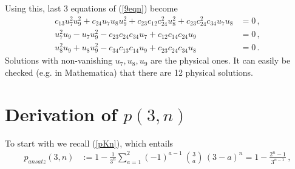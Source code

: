 \documentclass[12pt,a4paper]{JHEP3}
\newcommand{\refb}[1]{(\ref{#1})}
\begin{document}
Using this,  last 3 equations  of \refb{9eqn} become
\begin{align}
\nonumber
c_{13} u_7^2 u_9^2 + c_{24} u_7 u_8 u_9^2 +  c_{23} c_{12} c_{24}^2 u_8^2 + c_{23} c_{24}^2 c_{34}u_7 u_8 &= 0 \, , \\
\nonumber
u_7^2 u_9 - u_7 u_9^2 -  c_{23} c_{24} c_{34} u_7 + c_{12} c_{14} c_{24} u_9  &= 0 \, , \\
u_8^2 u_9 + u_8 u_9^2 - c_{34} c_{13} c_{14} u_9 + c_{23} c_{24} c_{34} u_8 &= 0 \, .
\end{align}
Solutions with non-vanishing $u_7,u_8,u_9$ are the physical ones. It can easily be checked (e.g. in Mathematica) that there are 12 physical solutions.
\section{Derivation  of $p(3,n)$} \label{appp3n}
To start with we recall  \refb{pKn}, which entails 
\begin{align}
p_{ansatz} (3,n) &:= 1 - \frac{1}{3^n} \sum_{a=1}^{2} (-1)^{a-1} ~ {{3} \choose {a}} \,  (3-a)^n 
= 1 - \frac{ 2^n - 1}{3^{n-1}} 
 \, , \label{p3n}
\end{align}
\end{document}
